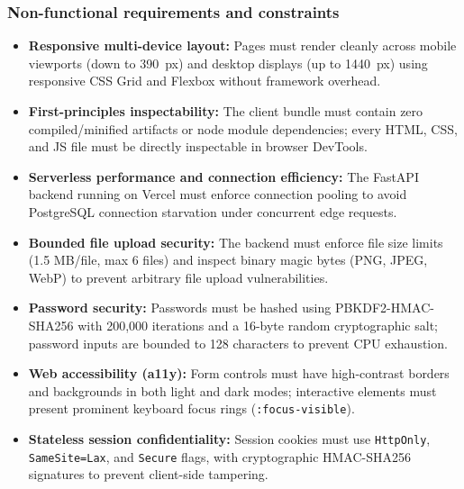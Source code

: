 \subsubsection{Non-functional requirements and constraints}
\begin{itemize}
  \item \textbf{Responsive multi-device layout:} Pages must render cleanly across mobile viewports (down to 390~px)
        and desktop displays (up to 1440~px) using responsive CSS Grid and Flexbox without framework overhead.
  \item \textbf{First-principles inspectability:} The client bundle must contain zero compiled/minified artifacts
        or node module dependencies; every HTML, CSS, and JS file must be directly inspectable in browser DevTools.
  \item \textbf{Serverless performance and connection efficiency:} The FastAPI backend running on Vercel
        must enforce connection pooling to avoid PostgreSQL connection starvation under concurrent edge requests.
  \item \textbf{Bounded file upload security:} The backend must enforce file size limits (1.5 MB/file, max 6 files)
        and inspect binary magic bytes (PNG, JPEG, WebP) to prevent arbitrary file upload vulnerabilities.
  \item \textbf{Password security:} Passwords must be hashed using PBKDF2-HMAC-SHA256 with 200,000 iterations
        and a 16-byte random cryptographic salt; password inputs are bounded to 128 characters to prevent CPU exhaustion.
  \item \textbf{Web accessibility (a11y):} Form controls must have high-contrast borders and backgrounds in both
        light and dark modes; interactive elements must present prominent keyboard focus rings (\texttt{:focus-visible}).
  \item \textbf{Stateless session confidentiality:} Session cookies must use \texttt{HttpOnly}, \texttt{SameSite=Lax},
        and \texttt{Secure} flags, with cryptographic HMAC-SHA256 signatures to prevent client-side tampering.
\end{itemize}

